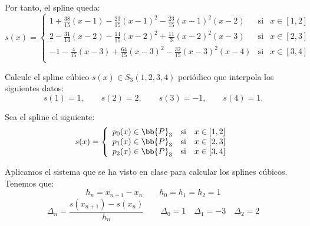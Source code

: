 \begin{ejercicio}
    Por tanto, el spline queda:
    \begin{equation*}
        s(x)=\left\{\begin{array}{ccl}
            1+\frac{38}{15}(x-1)-\frac{23}{15}(x-1)^2 -\frac{23}{15}(x-1)^2(x-2)& \text{si} & x\in [1, 2] \\
            2-\frac{31}{14}(x-2)-\frac{14}{15}(x-2)^2 +\frac{11}{3}(x-2)^2(x-3) & \text{si} & x\in [2, 3] \\
            -1-\frac{4}{15}(x-3)+\frac{64}{15}(x-3)^2 - \frac{32}{15}(x-3)^2(x-4)& \text{si} & x\in [3, 4] \\
        \end{array} \right.
    \end{equation*}
\end{ejercicio}

\begin{ejercicio}
    Calcule el spline cúbico $s(x) \in S_3(1, 2, 3, 4)$ periódico que interpola los siguientes datos:
    \begin{equation*}
        s(1) = 1,\qquad s(2) = 2,\qquad s(3) = -1,\qquad s(4) = 1.
    \end{equation*}

    Sea el spline el siguiente:
    \begin{equation*}
        s(x)=\left\{\begin{array}{ccl}
            p_0(x)\in \bb{P}_3 & \text{si} & x\in [1, 2] \\
            p_{1}(x)\in \bb{P}_3 & \text{si} & x\in [2, 3] \\
            p_{2}(x)\in \bb{P}_3 & \text{si} & x\in [3, 4] \\
        \end{array} \right.
    \end{equation*}

    Aplicamos el sistema que se ha visto en clase para calcular los splines cúbicos. Tenemos que:
    \begin{equation*}
        h_n = x_{n+1} - x_n \qquad h_0=h_1 = h_2 = 1
    \end{equation*}
    \begin{equation*}
        \Delta_n = \frac{s(x_{n+1}) - s(x_n)}{h_n} \qquad \Delta_0=1 \quad \Delta_1=-3 \quad \Delta_2=2
    \end{equation*}


\end{ejercicio}
